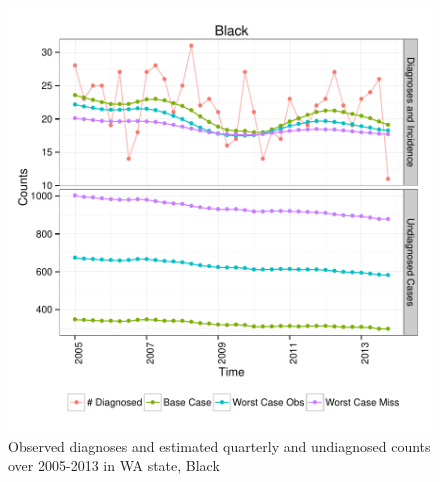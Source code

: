 \documentclass{article}\usepackage[]{graphicx}\usepackage[]{color}
\makeatletter
\def\maxwidth{ %
  \ifdim\Gin@nat@width>\linewidth
    \linewidth
  \else
    \Gin@nat@width
  \fi
}
\newenvironment{knitrout}{}{} %
\makeatother
\begin{document}
\begin{knitrout}\footnotesize
{}\color{fgcolor}\begin{figure}[]


{\centering \includegraphics[width=\maxwidth]{figure/minimal-plot_subgroup_Black} 

}

\caption[Observed diagnoses and estimated quarterly and undiagnosed counts over 2005-2013 in WA state, Black]{Observed diagnoses and estimated quarterly and undiagnosed counts over 2005-2013 in WA state, Black\label{fig:plot_subgroup_Black}}
\end{figure}


\end{knitrout}
\end{document}

